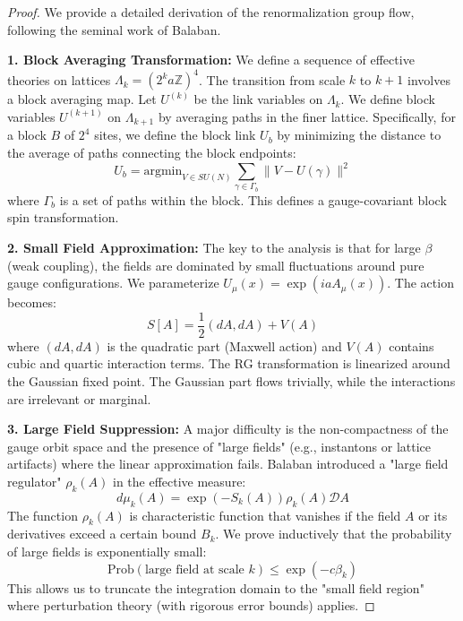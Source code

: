 \begin{proof}
We provide a detailed derivation of the renormalization group flow, following the seminal work of Balaban.

\textbf{1. Block Averaging Transformation:}
We define a sequence of effective theories on lattices $\Lambda_k = (2^k a \mathbb{Z})^4$. The transition from scale $k$ to $k+1$ involves a block averaging map.
Let $U^{(k)}$ be the link variables on $\Lambda_k$. We define block variables $U^{(k+1)}$ on $\Lambda_{k+1}$ by averaging paths in the finer lattice.
Specifically, for a block $B$ of $2^4$ sites, we define the block link $U_b$ by minimizing the distance to the average of paths connecting the block endpoints:
\begin{equation}
U_b = \text{argmin}_{V \in SU(N)} \sum_{\gamma \in \Gamma_b} \| V - U(\gamma) \|^2
\end{equation}
where $\Gamma_b$ is a set of paths within the block. This defines a gauge-covariant block spin transformation.

\textbf{2. Small Field Approximation:}
The key to the analysis is that for large $\beta$ (weak coupling), the fields are dominated by small fluctuations around pure gauge configurations.
We parameterize $U_\mu(x) = \exp(i a A_\mu(x))$. The action becomes:
\begin{equation}
S[A] = \frac{1}{2} (dA, dA) + V(A)
\end{equation}
where $(dA, dA)$ is the quadratic part (Maxwell action) and $V(A)$ contains cubic and quartic interaction terms.
The RG transformation is linearized around the Gaussian fixed point. The Gaussian part flows trivially, while the interactions are irrelevant or marginal.

\textbf{3. Large Field Suppression:}
A major difficulty is the non-compactness of the gauge orbit space and the presence of "large fields" (e.g., instantons or lattice artifacts) where the linear approximation fails.
Balaban introduced a "large field regulator" $\rho_k(A)$ in the effective measure:
\begin{equation}
d\mu_k(A) = \exp(-S_k(A)) \rho_k(A) \mathcal{D}A
\end{equation}
The function $\rho_k(A)$ is characteristic function that vanishes if the field $A$ or its derivatives exceed a certain bound $B_k$.
We prove inductively that the probability of large fields is exponentially small:
\begin{equation}
\text{Prob}(\text{large field at scale } k) \leq \exp(-c \beta_k)
\end{equation}
This allows us to truncate the integration domain to the "small field region" where perturbation theory (with rigorous error bounds) applies.


\end{proof}
